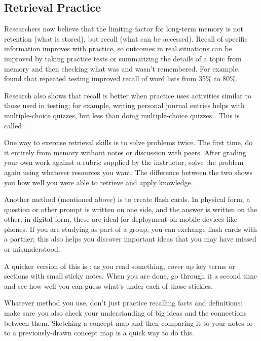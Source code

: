 \subsection*{Retrieval Practice}

Researchers now believe that the limiting factor for long-term memory is
not retention (what is stored), but recall (what can be accessed).
Recall of specific information improves with practice, so outcomes in
real situations can be improved by taking practice tests or summarizing
the details of a topic from memory and then checking what was and wasn't
remembered. For example, \cite{Karp2008} found that repeated testing
improved recall of word lists from 35\% to 80\%.

Research also shows that recall is better when practice uses
activities similar to those used in testing; for example, writing
personal journal entries helps with multiple-choice quizzes, but less
than doing multiple-choice quizzes \cite{Mill2016a}. This is
called .

One way to exercise retrieval skills is to solve problems twice. The
first time, do it entirely from memory without notes or discussion with
peers. After grading your own work against a rubric supplied by the
instructor, solve the problem again using whatever resources you want.
The difference between the two shows you how well you were able to
retrieve and apply knowledge.

Another method (mentioned above) is to create flash cards. In physical
form, a question or other prompt is written on one side, and the answer
is written on the other; in digital form, these are ideal for deployment
on mobile devices like phones. If you are studying as part of a group,
you can exchange flash cards with a partner; this also helps you
discover important ideas that you may have missed or misunderstood.

A quicker version of this is
: as you read something,
cover up key terms or sections with small sticky notes. When you are
done, go through it a second time and see how well you can guess
what's under each of those stickies.

Whatever method you use, don't just practice recalling facts and
definitions: make sure you also check your understanding of big ideas
and the connections between them. Sketching a concept map and then
comparing it to your notes or to a previously-drawn concept map is a
quick way to do this.


